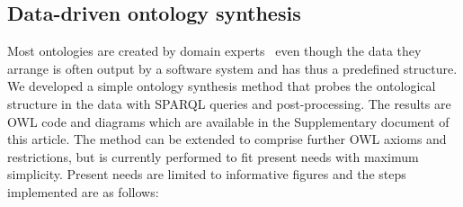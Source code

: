 \documentclass[data,datadescriptor,submit,moreauthors,pdftex]{Definitions/mdpi}
\begin{document}
\subsection{Data-driven ontology synthesis}\label{ont}
Most ontologies are created by domain experts~\cite{ont}
even though the data they arrange is often output by a software system
and has thus a predefined structure.  
We developed a simple ontology synthesis method that probes
the ontological structure in the data with
SPARQL queries and post-processing.
The results are OWL code and diagrams which are available in the
Supplementary document of this article.
The method can be extended to comprise further OWL axioms and restrictions,
but is currently performed to fit present needs with maximum simplicity.
Present needs are limited to informative figures and
the steps implemented are as follows:
\end{document}
